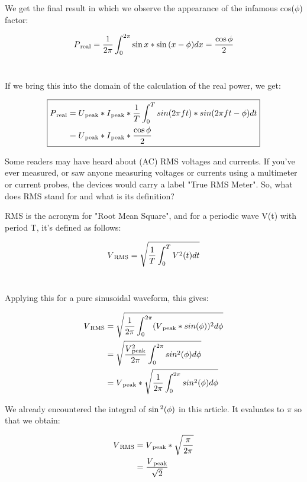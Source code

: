 \documentclass[a4paper]{article}
\def\SP#1{\textsuperscript{#1}}
\def\SB#1{\textsubscript{{#1}}}
\def\SPSB#1#2{\rlap{\textsuperscript{#1}}\SB{#2}}
\begin{document}
We get the final result in which we observe the appearance of
the infamous cos($\phi$) factor:

\begin{align*}
  P\SB{real} &=\frac{1}{2 \pi}\int_0^{2\pi}\sin{x} * \sin{(x - \phi)}dx = \frac{\cos{\phi}}{2}\\
\end{align*}\

If we bring this into the domain of the calculation of the real power,
we get:

\begin{equation}
\boxed{
\begin{aligned}
  P\SB{real} &= U\SB{peak} * I\SB{peak} * \frac{1}{T} \int_0^{T}{sin(2\pi ft) * sin(2\pi ft - \phi)} dt\\
  &= U\SB{peak} * I\SB{peak} * \frac{\cos{\phi}}{2}
\end{aligned}
}
\end{equation}

Some readers may have heard about (AC) RMS voltages and currents. If
you've ever measured, or saw anyone measuring voltages or currents using a
multimeter or current probes, the devices would carry a label "True RMS
Meter". So, what does RMS stand for and what is its definition?

RMS is the acronym for "Root Mean Square", and for a periodic wave V(t) with
period T, it's defined as follows:

\begin{align*}
  V\SB{RMS} &= \sqrt{\frac{1}{T} \int_0^{T} V\SP{2}(t) dt}\\
\end{align*}\

Applying this for a pure sinusoidal waveform, this gives:

\begin{align*}
  V\SB{RMS} &= \sqrt{\frac{1}{2 \pi} \int_0^{2 \pi} (V\SB{peak} * sin(\phi))\SP{2} d\phi}\\
  &= \sqrt{\frac{V\SPSB{2}{peak}}{2 \pi} \int_0^{2 \pi} sin\SP{2}(\phi) d\phi}\\
  &= V\SB{peak} * \sqrt{\frac{1}{2 \pi} \int_0^{2 \pi} sin\SP{2}(\phi) d\phi}\\
\end{align*}

We already encountered the integral of $\sin\SP{2}(\phi)$ in this article.
It evaluates to $\pi$ so that we obtain:

\begin{align*}
  V\SB{RMS} &= V\SB{peak} * \sqrt{\frac{\pi}{2 \pi}}\\
  &= \frac{V\SB{peak}}{\sqrt{2}}\\
\end{align*}
\end{document}
